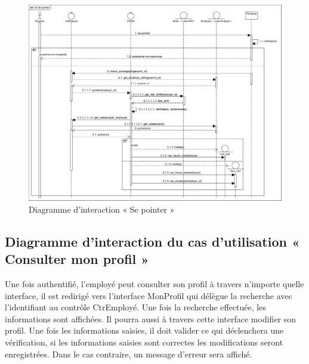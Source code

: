 \begin{figure}[h!]
    \centering
    \includegraphics[scale=0.56]{images/DS/DI Se pointer.png}
    \caption{Diagramme d'interaction « Se pointer »}
    \label{fig34}
\end{figure}
        
\clearpage
    
\subsection*{Diagramme d'interaction du cas d'utilisation « Consulter mon profil »}
Une fois authentifié, l’employé peut consulter son profil à travers n’importe 
quelle interface, il est redirigé vers l’interface MonProfil qui délègue la 
recherche avec l’identifiant au contrôle CtrEmployé. Une fois la recherche 
effectuée, les informations sont affichées. Il pourra aussi à travers cette 
interface modifier son profil. Une fois les informations saisies, il doit 
valider ce qui déclenchera une vérification, si les informations saisies sont 
correctes les modifications seront enregistrées. Dans le cas contraire, un 
message d’erreur sera affiché.

